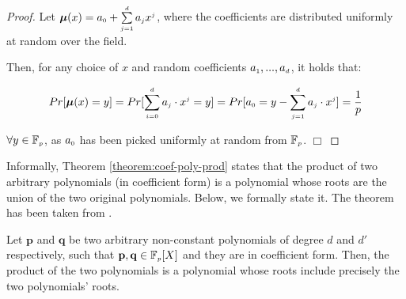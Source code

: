 \begin{proof} Let $\bm\mu(x)=a_{\scriptscriptstyle 0}+\sum\limits^{\scriptscriptstyle d}_{\scriptscriptstyle j=1} a_{\scriptscriptstyle j}x^{\scriptscriptstyle j}$, where the  coefficients  are distributed uniformly at random over the field. 



Then, for any choice of $x$ and random coefficients   $a_{\scriptscriptstyle 1},...,a_{\scriptscriptstyle d}$, it holds that:

$$Pr[\bm\mu(x)=y]=Pr[\sum\limits_{\scriptscriptstyle i=0}^{\scriptscriptstyle d} a_{\scriptscriptstyle j}\cdot x^{\scriptscriptstyle j} = y] = Pr[a_{\scriptscriptstyle 0} = y-\sum\limits_{\scriptscriptstyle j=1}^{\scriptscriptstyle d} a_{\scriptscriptstyle j}\cdot x^{\scriptscriptstyle j}] = \frac{1}{p}$$

  $\forall y\in \mathbb{F}_{\scriptscriptstyle p}$, as $a_{\scriptscriptstyle 0}$ has been picked uniformly at random from $\mathbb{F}_{\scriptscriptstyle p}$. 
%
\hfill\(\Box\)
\end{proof} 



Informally, Theorem \ref{theorem:coef-poly-prod} states that the product of two arbitrary polynomials (in coefficient form) is a polynomial whose roots are the union of the two original polynomials.  Below, we formally state it. The theorem has been taken from \cite{AbadiMZ21}. 


\begin{theorem}\label{theorem:coef-poly-prod}
Let $\mathbf{p}$ and   $\mathbf{q}$ be two arbitrary non-constant polynomials of degree $d$ and $d'$ respectively, such that  $\mathbf{p} , \mathbf{q}   \in \mathbb{F}_{\scriptscriptstyle p}[X]$ and they are in coefficient form. Then, the product of the two polynomials is a polynomial whose roots include precisely the two polynomials' roots. 
\end{theorem}





